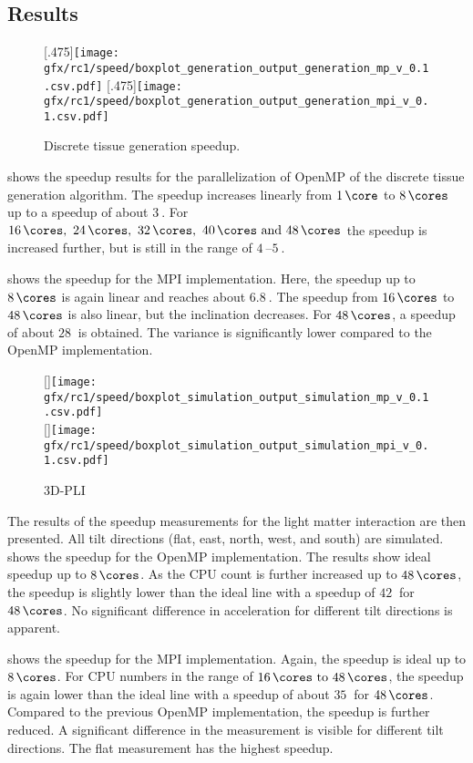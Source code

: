 \subsection{Results}
%
\begin{figure}[!t]
\centering
{}[.475\textwidth]{\texttt{[image: gfx/rc1/speed/boxplot\_generation\_output\_generation\_mp\_v\_0.1.csv.pdf]}}
\hfill
{}[.475\textwidth]{\texttt{[image: gfx/rc1/speed/boxplot\_generation\_output\_generation\_mpi\_v\_0.1.csv.pdf]}}
\caption[]{Discrete tissue generation speedup.}
\end{figure}
%
 shows the speedup results for the parallelization of \ac{OpenMP} of the discrete tissue generation algorithm.
The speedup increases linearly from $\SI{1}{\core}$ to $\SI{8}{\cores}$ up to a speedup of about $\SI{3}{}$.
For $\SIlist{16;24;32;40;48}{\cores}$ the speedup is increased further, but is still in the range of $\SIrange{4}{5}{}$.
\par
%
 shows the speedup for the \ac{MPI} implementation.
Here, the speedup up to $\SI{8}{\cores}$ is again linear and reaches about $\SI{6.8}{}$.
The speedup from $\SI{16}{\cores}$ to $\SI{48}{\cores}$ is also linear, but the inclination decreases.
For $\SI{48}{\cores}$, a speedup of about $\SI{28}{}$ is obtained.
The variance is significantly lower compared to the \ac{OpenMP} implementation.
\par
%
\begin{figure}[!t]
\centering
{}[\textwidth]{\texttt{[image: gfx/rc1/speed/boxplot\_simulation\_output\_simulation\_mp\_v\_0.1.csv.pdf]}}
\\
[\textwidth]{\texttt{[image: gfx/rc1/speed/boxplot\_simulation\_output\_simulation\_mpi\_v\_0.1.csv.pdf]}}
\caption[]{\ac{3D-PLI}}
\end{figure}
%
The results of the speedup measurements for the light matter interaction are then presented.
All tilt directions (flat, east, north, west, and south) are simulated.
 shows the speedup for the \ac{OpenMP} implementation.
The results show ideal speedup up to $\SI{8}{\cores}$.
As the \ac{CPU} count is further increased up to $\SI{48}{\cores}$, the speedup is slightly lower than the ideal line with a speedup of $\SI{42}{}$ for $\SI{48}{\cores}$.
No significant difference in acceleration for different tilt directions is apparent.
\par
%
 shows the speedup for the \ac{MPI} implementation.
Again, the speedup is ideal up to $\SI{8}{\cores}$.
For \ac{CPU} numbers in the range of $\SIrange{16}{48}{\cores}$, the speedup is again lower than the ideal line with a speedup of about $\SI{35}{}$ for $\SI{48}{\cores}$.
Compared to the previous \ac{OpenMP} implementation, the speedup is further reduced.
A significant difference in the measurement is visible for different tilt directions.
The flat measurement has the highest speedup.
%
%
%
